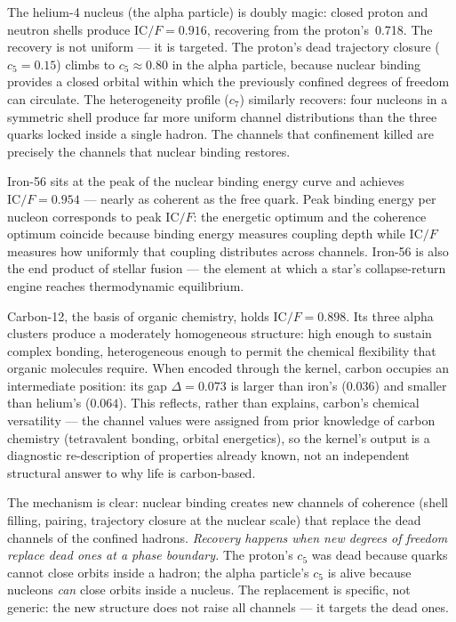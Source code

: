 \documentclass[
  aps,
  prd,
  twocolumn,
  superscriptaddress,
  nofootinbib,
  floatfix
]{revtex4-2}
\newcommand{\IC}{\mathrm{IC}}
\begin{document}
The helium-4 nucleus (the alpha particle) is doubly magic:
closed proton and neutron shells produce $\IC/F = 0.916$,
recovering from the proton's~0.718.  The recovery is not
uniform --- it is targeted.  The proton's dead trajectory
closure ($c_5 = 0.15$) climbs to $c_5 \approx 0.80$ in the
alpha particle, because nuclear binding provides a closed
orbital within which the previously confined degrees of
freedom can circulate.  The heterogeneity profile ($c_7$)
similarly recovers: four nucleons in a symmetric shell
produce far more uniform channel distributions than the
three quarks locked inside a single hadron.  The channels
that confinement killed are precisely the channels that
nuclear binding restores.

Iron-56 sits at the peak of the nuclear binding energy
curve and achieves $\IC/F = 0.954$ --- nearly as coherent
as the free quark.   Peak binding energy per nucleon
corresponds to peak $\IC/F$: the energetic optimum and
the coherence optimum coincide because binding energy
measures coupling depth while $\IC/F$ measures how
uniformly that coupling distributes across channels.
Iron-56 is also the end product of stellar
fusion --- the element at which a star's collapse-return
engine reaches thermodynamic equilibrium.

Carbon-12, the basis of organic chemistry, holds
$\IC/F = 0.898$.  Its three alpha clusters produce a
moderately homogeneous structure: high enough to sustain
complex bonding, heterogeneous enough to permit the
chemical flexibility that organic molecules require.
When encoded through the kernel, carbon occupies an
intermediate position: its gap $\Delta = 0.073$ is larger
than iron's ($0.036$) and smaller than helium's ($0.064$).
This reflects, rather than explains, carbon's chemical
versatility --- the channel values were assigned from
prior knowledge of carbon chemistry (tetravalent bonding,
orbital energetics), so the kernel's output is a
diagnostic re-description of properties already known,
not an independent structural answer to why life is
carbon-based.

The mechanism is clear: nuclear binding creates new channels
of coherence (shell filling, pairing, trajectory closure at
the nuclear scale) that replace the dead channels of the
confined hadrons.  \emph{Recovery happens when new degrees of
freedom replace dead ones at a phase boundary.}  The proton's
$c_5$ was dead because quarks cannot close orbits inside a
hadron; the alpha particle's $c_5$ is alive because nucleons
\emph{can} close orbits inside a nucleus.  The replacement
is specific, not generic: the new structure does not raise
all channels --- it targets the dead ones.
\end{document}
